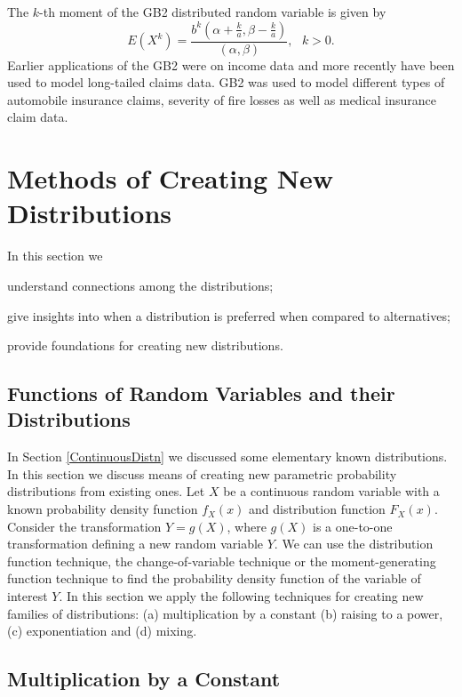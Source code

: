 \documentclass[]{book}
\theoremstyle{definition}
\theoremstyle{definition}
\theoremstyle{definition}
\theoremstyle{remark}
\begin{document}
The \(k\)-th moment of the GB2 distributed random variable is given by
\[E\left( X^{k} \right) = \frac{b^{k}\left( \alpha + \frac{k}{a},\beta - \frac{k}{a} \right)}{\left( \alpha,\beta \right)}, \ \ \ k > 0.\]
Earlier applications of the GB2 were on income data and more recently
have been used to model long-tailed claims data. GB2 was used to model
different types of automobile insurance claims, severity of fire losses
as well as medical insurance claim data.

\section{Methods of Creating New Distributions}\label{MethodsCreation}

In this section we

understand connections among the distributions;

give insights into when a distribution is preferred when compared to
alternatives;

provide foundations for creating new distributions.

\subsection{Functions of Random Variables and their
Distributions}\label{functions-of-random-variables-and-their-distributions}

In Section \ref{ContinuousDistn} we discussed some elementary known
distributions. In this section we discuss means of creating new
parametric probability distributions from existing ones. Let \(X\) be a
continuous random variable with a known probability density function
\(f_{X}(x)\) and distribution function \(F_{X}(x)\). Consider the
transformation \(Y = g\left( X \right)\), where \(g(X)\) is a one-to-one
transformation defining a new random variable \(Y\). We can use the
distribution function technique, the change-of-variable technique or the
moment-generating function technique to find the probability density
function of the variable of interest \(Y\). In this section we apply the
following techniques for creating new families of distributions: (a)
multiplication by a constant (b) raising to a power, (c) exponentiation
and (d) mixing.

\subsection{Multiplication by a
Constant}\label{multiplication-by-a-constant}
\end{document}
